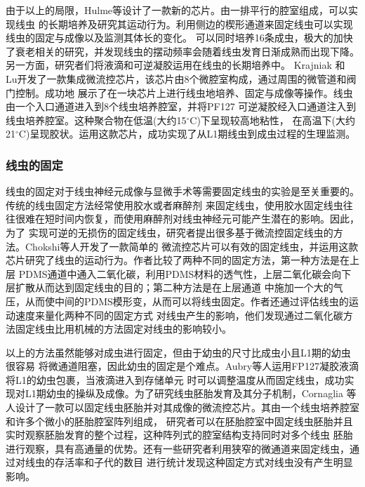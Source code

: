 	由于以上的局限，Hulme等\cite{Hulme2010Lifespan}设计了一款新的芯片。由一排平行的腔室组成，可以实现线虫
	的长期培养及研究其运动行为。利用侧边的楔形通道来固定线虫可以实现线虫的固定与成像以及监测其体长的变化。
	可以同时培养16条成虫，极大的加快了衰老相关的研究，并发现线虫的摆动频率会随着线虫发育日渐成熟而出现下降。
	另一方面，研究者们将液滴和可逆凝胶运用在线虫的长期培养中\cite{Aubry2015Hydrogel,Krajniak2010Long,Wen2015A,Cornaglia2016Automated}。
	Krajniak 和 Lu\cite{Krajniak2010Long}开发了一款集成微流控芯片，该芯片由8个微腔室构成，通过周围的微管道和阀门控制。成功地
	展示了在一块芯片上进行线虫地培养、固定与成像等操作。线虫由一个入口通道进入到8个线虫培养腔室，并将PF127
	可逆凝胶经入口通道注入到线虫培养腔室。这种聚合物在低温(大约15$^\circ$C)下呈现较高地粘性，
	在高温下(大约21$^\circ$C)呈现胶状。运用这款芯片，成功实现了从L1期线虫到成虫过程的生理监测。
\subsubsection{线虫的固定}
\label{sec:intro:analog}
	线虫的固定对于线虫神经元成像与显微手术\cite{Gokce2014A}等需要固定线虫的实验是至关重要的。传统的线虫固定方法经常使用胶水或者麻醉剂
	来固定线虫，使用胶水固定线虫往往很难在短时间内恢复，而使用麻醉剂对线虫神经元可能产生潜在的影响。因此，为了
	实现可逆的无损伤的固定线虫，研究者提出很多基于微流控固定线虫的方法。Chokshi等人\cite{Chokshi2009CO2}开发了一款简单的
	微流控芯片可以有效的固定线虫，并运用这款芯片研究了线虫的运动行为。作者比较了两种不同的固定方法，第一种方法是在上层
	PDMS通道中通入二氧化碳，利用PDMS材料的透气性，上层二氧化碳会向下层扩散从而达到固定线虫的目的；第二种方法是在上层通道
	中施加一个大的气压，从而使中间的PDMS模形变，从而可以将线虫固定。作者还通过评估线虫的运动速度来量化两种不同的固定方式
	对线虫产生的影响，他们发现通过二氧化碳方法固定线虫比用机械的方法固定对线虫的影响较小。
	
	以上的方法虽然能够对成虫进行固定，但由于幼虫的尺寸比成虫小且L1期的幼虫很容易
	将微通道阻塞，因此幼虫的固定是个难点。Aubry等人\cite{Aubry2015Hydrogel}运用FP127凝胶液滴将L1的幼虫包裹，当液滴进入到存储单元
	时可以调整温度从而固定线虫，成功实现对L1期幼虫的操纵及成像。为了研究线虫胚胎发育及其分子机制，Cornaglia
	等人\cite{Cornaglia2015An}设计了一款可以固定线虫胚胎并对其成像的微流控芯片。其由一个线虫培养腔室和许多个微小的胚胎腔室阵列组成，
	研究者可以在胚胎腔室中固定线虫胚胎并且实时观察胚胎发育的整个过程，这种阵列式的腔室结构支持同时对多个线虫
	胚胎进行观察，具有高通量的优势。还有一些研究者利用狭窄的微通道来固定线虫\cite{Lee2014A,Hulme2007A}，通过对线虫的存活率和子代的数目
	进行统计发现这种固定方式对线虫没有产生明显影响。
